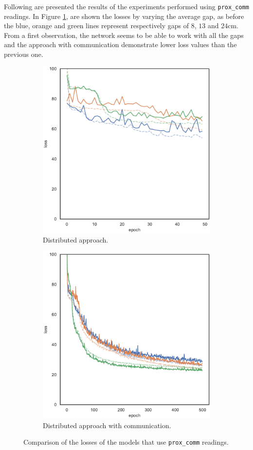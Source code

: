 Following are presented the results of the experiments performed using 
\texttt{prox\_comm} readings. In Figure \ref{fig:commlossprox_comm}, are 
shown the losses by varying the average gap, as before the blue, orange and 
green lines represent respectively gaps of $8$, $13$ and $24$\gls{cm}. From a 
first observation, the network seems to be able to work with all the gaps and the  
approach with communication demonstrate lower loss values than the previous 
one.
\begin{figure}[!htb]
	\begin{center}
			\begin{subfigure}[h]{0.49\textwidth}
			\centering
			\includegraphics[width=.7\textwidth]{contents/images/task1-comm/loss-distributed-prox_comm@copy}
			\caption{Distributed approach.}
		\end{subfigure}
		\hfill
		\begin{subfigure}[h]{0.49\textwidth}
			\centering
			\includegraphics[width=.7\textwidth]{contents/images/task1-comm/loss-communication-prox_comm@copy}
			\caption{Distributed approach with communication.}
		\end{subfigure}	
	\end{center}
	\vspace{-0.5cm}
	\caption{Comparison of the losses of the models that use \texttt{prox\_comm} 
		readings.}
	\label{fig:commlossprox_comm}
\end{figure}

